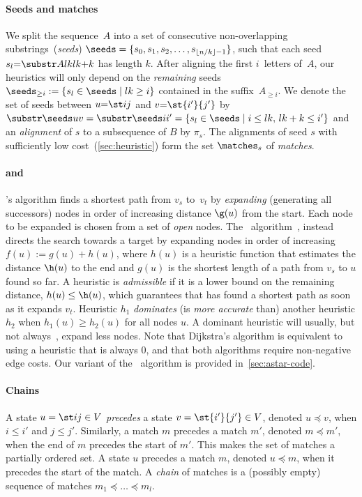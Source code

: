 \paragraph{Seeds and matches}
We split the sequence~$A$ into a set of consecutive non-overlapping
substrings~(\emph{seeds}) $\seeds=\{s_0, s_1, s_2, \dots, s_{\lfloor n/k
\rfloor-1}\}$, such that each seed $s_l {=} \substr A{lk}{lk{+}k}$ has length
$k$. After aligning the first $i$~letters of~$A$, our heuristics will only
depend on the \emph{remaining} seeds ${\seeds_{\geq i} := \{s_l \in \seeds \mid
lk \geq i\}}$ contained in the suffix~$A_{\geq i}$. We denote the set of seeds
between $u{=}\st ij$ and $v{=}\st{i'}{j'}$ by $\substr \seeds uv = \substr
\seeds i{i'} = {\{s_l\in \seeds \mid i\leq lk, \, lk+k \leq i'\}}$ and an
\emph{alignment} of $s$ to a subsequence of $B$ by $\pi_s$. The alignments of
seed $s$ with sufficiently low cost~(\cref{sec:heuristic}) form the set
$\matches_s$ of \emph{matches}.

\paragraph{\dijkstra and \A}
\dijkstra's algorithm \citep{dijkstra1959note} finds a shortest path from $v_s$
to~$v_t$ by \emph{expanding} (generating all successors) nodes in order of
increasing distance $\g(u)$ from the start. Each node to be expanded is chosen
from a set of \emph{open} nodes. The
\A~algorithm~\citep{hart1968formal,pearl1984heuristics}, instead directs the
search towards a target by expanding nodes in order of increasing ${f(u) :=
g(u) + h(u)}$, where $h(u)$ is a heuristic function that estimates the distance
$\h(u)$ to the end and $g(u)$ is the shortest length of a path from $v_s$ to $u$
found so far. A heuristic is \emph{admissible} if it is a lower bound on the
remaining distance, $h(u) \leq \h(u)$, which guarantees that \A has found a
shortest path as soon as it expands $v_t$. Heuristic $h_1$ \emph{dominates} (is
\emph{more accurate} than) another heuristic $h_2$ when $h_1(u) \ge h_2(u)$ for
all nodes $u$. A dominant heuristic will usually, but not
always~\citep{holte2010common}, expand less nodes. Note that Dijkstra's
algorithm is equivalent to \A using a heuristic that is always $0$, and that
both algorithms require non-negative edge costs. Our variant of the \A~algorithm
is provided in~\cref{sec:astar-code}.

\paragraph{Chains}
A state $u=\st ij\in V$ \emph{precedes} a state $v=\st {i'}{j'}\in V$, denoted
$u\preceq v$, when $i\leq i'$ and $j\leq j'$. Similarly, a match $m$ precedes a
match $m'$, denoted $m\preceq m'$, when the end of $m$ precedes the start of
$m'$. This makes the set of matches a partially ordered set.
A state $u$ precedes a match $m$, denoted $u\preceq m$, when it precedes
the start of the match. A \emph{chain} of matches is a (possibly empty) sequence
of matches $m_1 \preceq \dots \preceq m_l$.

